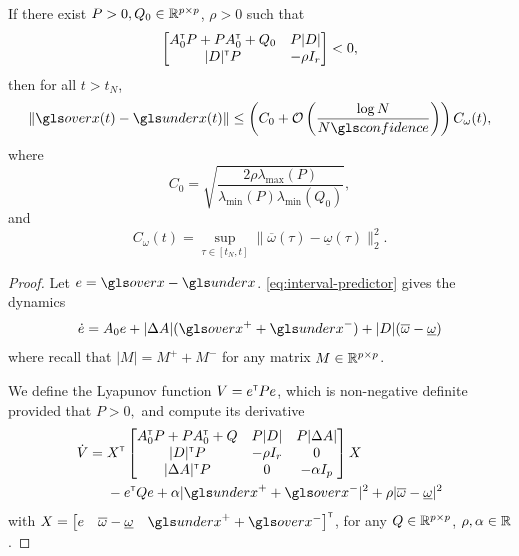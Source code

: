 \begin{subappendices}
	\begin{lemma}
		\begin{leftbar}[lemmabar]
		If there exist $P>0,Q_0\in\mathbb{R}^{p\times p}$, $\rho>0$ such that
		\begin{align*}
		\begin{bmatrix}
		A_0^{\mathsf{\scriptscriptstyle T}} P + P A_0^{\mathsf{\scriptscriptstyle T}} + Q_0 & P|D|  \\
		|D|^{\mathsf{\scriptscriptstyle T}} P & -\rho I_r \\
		\end{bmatrix}< 0,
		\end{align*}
		then for all $t> t_N$,
		\[\|\ox(t) - \ux(t)\| \leq \left(C_0 + \cO\left({\frac{\log N}{N\confidence}} \right)\right)C_\omega(t), \]
		where $$C_0 = \sqrt{\frac{2\rho\lambda_{\max}(P)}{\lambda_{\min}(P)\lambda_{\min}(Q_0)}},$$ and $$C_\omega(t) = \sup_{\tau\in[t_N,t]} \|\overline{\omega}(\tau) - \underline{\omega}(\tau)\|_2^2.$$
		\end{leftbar}
	\end{lemma}
	\begin{proof}
		Let $e = \ox - \ux$. \eqref{eq:interval-predictor} gives the dynamics
		\begin{align*}
		\dot{e} = A_0e + |\Delta A|(\ox^+ + \ux^-) + |D|(\overline{\omega} - \underline{\omega})
		\end{align*}
		where recall that $|M| = M^+ + M^-$ for any matrix $M\in\mathbb{R}^{p\times p}$.
		
		We define the Lyapunov function $V = e^{\mathsf{\scriptscriptstyle T}} P e$, which is non-negative definite provided that
		$
		P>0,
		$ and compute its derivative
		\begin{align*}
		\dot{V} ={}& X^\transp
		\begin{bmatrix}
		A_0^\transp P + P A_0^\transp + Q & P|D| & P|\Delta A| \\
		|D|^\transp P & -\rho I_r & 0\\
		|\Delta A|^\transp P & 0 & -\alpha I_p
		\end{bmatrix}
		X\\
		& - e^\transp Q e + \alpha |\ux^+ + \ox^-|^2 + \rho |\overline{\omega} - \underline{\omega}|^2
		\end{align*}
		with $X=\begin{bmatrix}
		e & \overline{\omega} - \underline{\omega} &  \ux^+ + \ox^-
		\end{bmatrix}^\transp$, for any $Q\in\mathbb{R}^{p\times p}$, $\rho,\alpha\in\mathbb{R}$ . 
		

\end{proof}
\end{subappendices}
